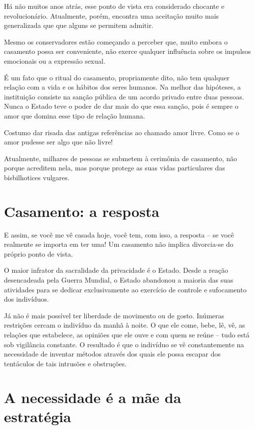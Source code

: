 Há não muitos anos atrás, esse ponto de vista era considerado chocante e
revolucionário. Atualmente, porém, encontra uma aceitação muito mais
generalizada que que alguns se permitem admitir.

Mesmo os conservadores estão começando a perceber que, muito embora o
casamento possa ser conveniente, não exerce qualquer influência sobre os
impulsos emocionais ou a expressão sexual.

É um fato que o ritual do casamento, propriamente dito, não tem qualquer
relação com a vida e os hábitos dos seres humanos. Na melhor das
hipóteses, a instituição consiste na sanção pública de um acordo privado
entre duas pessoas. Nunca o Estado teve o poder de dar mais do que essa
sanção, pois é sempre o amor que domina esse tipo de relação humana.

Costumo dar risada das antigas referências ao chamado amor livre. Como
se o amor pudesse ser algo que não livre!

Atualmente, milhares de pessoas se submetem à cerimônia de casamento,
não porque acreditem nela, mas porque protege as suas vidas particulares
das bisbilhotices vulgares.

\section{Casamento: a resposta}

E assim, se você me vê casada hoje, você tem, com isso, a resposta -- se
você realmente se importa em ter uma! Um casamento não implica
divorcia-se do próprio ponto de vista.

O maior infrator da sacralidade da privacidade é o Estado. Desde a
reação desencadeada pela Guerra Mundial, o Estado abandonou a maioria
das suas atividades para se dedicar exclusivamente ao exercício de
controle e sufocamento dos indivíduos.

Já não é mais possível ter liberdade de movimento ou de gosto. Inúmeras
restrições cercam o indivíduo da manhã à noite. O que ele come, bebe,
lê, vê, as relações que estabelece, as opiniões que ele ouve e com quem
se reúne -- tudo está sob vigilância constante. O resultado é que o
indivíduo se vê constantemente na necessidade de inventar métodos
através dos quais ele possa escapar dos tentáculos de tais intrusões e
obstruções.

\section{A necessidade é a mãe da estratégia}

